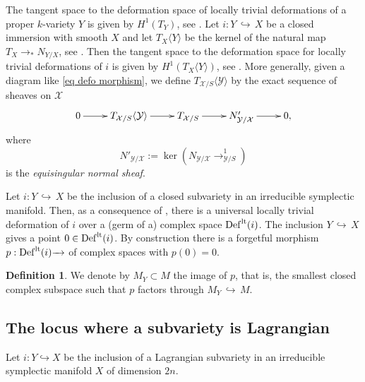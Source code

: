 \documentclass[a4paper,11pt,final]{amsart}
\theoremstyle{plain}
\theoremstyle{definition}
\newtheorem{definition}[subsection]{Definition}
\numberwithin{equation}{section}
\theoremstyle{remark}
\begin{document}
The tangent space to the deformation space of locally trivial deformations of a proper $k$-variety $Y$ is given by $H^1(T_Y)$, see \cite[Proposition 1.2.9]{Se}. Let $i:Y{{\, \hookrightarrow\,}} X$ be a closed immersion with smooth $X$ and let $T_{X}\langle Y\rangle$ be the kernel of the natural map $T_X {\xrightarrow{\ \ }}_*N_{Y/X}$, see \cite[3.4.4]{Se}. Then the tangent space to the deformation space for locally trivial deformations of $i$ is given by $H^1(T_{X}\langle Y\rangle)$, see \cite[Proposition 3.4.17]{Se}. 
More generally, given a diagram like \eqref{eq defo morphism}, we define $T_{{{\mathcal X}}/S}\langle {{\mathcal Y}}\rangle$ by the exact sequence of sheaves on ${{\mathcal X}}$
\begin{equation}\label{defo of morphism}
\begin{xy}
\xymatrix{
0\ar[r] & T_{{{\mathcal X}}/S}\langle {{\mathcal Y}}\rangle \ar[r]&  T_{{{\mathcal X}}/S} \ar[r]& N'_{{{\mathcal Y}}/{{\mathcal X}}} \ar[r]& 0,\\
}
\end{xy}
\end{equation}
where
\begin{equation}\label{eq ns}
N'_{{{\mathcal Y}}/{{\mathcal X}}}:=\ker(N_{{{\mathcal Y}}/{{\mathcal X}}} {\xrightarrow{\ \ }}^1_{{{\mathcal Y}}/S})
\end{equation}
is the \emph{equisingular normal sheaf}.

Let $i:Y{{\, \hookrightarrow\,}} X$ be the inclusion of a closed subvariety in an irreducible symplectic manifold. Then, as a consequence of \cite{FK}, there is a universal locally trivial deformation of $i$ over a (germ of a) complex space ${{\operatorname{Def}}}^{{\rm{lt}}}(i)$.
 The inclusion $Y {{\, \hookrightarrow\,}} X$ gives a point $0\in {{\operatorname{Def}}}^{{\rm{lt}}}(i)$. By construction there is a forgetful morphism $p:{{\operatorname{Def}}}^{{\rm{lt}}}(i) {\xrightarrow{\ \ }}$ of complex spaces with $p(0)=0$. 
\begin{definition}\label{definition my}
We denote by $M_Y \subset M$ the image of $p$, that is, the smallest closed complex subspace such that $p$ factors through $M_Y {{\, \hookrightarrow\,}} M$.
\end{definition}
\subsection{The locus where a subvariety is Lagrangian}\label{subsec subspaces for lagrangian}
Let $i: Y \hookrightarrow X$ be the inclusion of a Lagrangian subvariety in an irreducible symplectic manifold $X$ of dimension $2n$.
\end{document}
